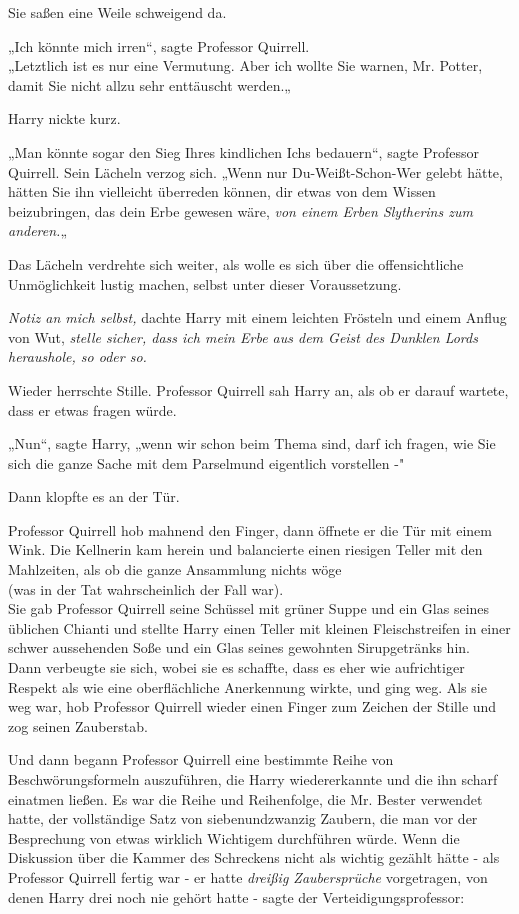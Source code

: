 {Sie saßen eine Weile schweigend da.

„Ich könnte mich irren“, sagte Professor Quirrell.\\ „Letztlich ist es nur eine Vermutung. Aber ich wollte Sie warnen, Mr. Potter, damit Sie nicht allzu sehr enttäuscht werden.„

Harry nickte kurz.

„Man könnte sogar den Sieg Ihres kindlichen Ichs bedauern“, sagte Professor Quirrell. Sein Lächeln verzog sich. „Wenn nur Du-Weißt-Schon-Wer gelebt hätte, hätten Sie ihn vielleicht überreden können, dir etwas von dem Wissen beizubringen, das dein Erbe gewesen wäre, \emph{von einem Erben Slytherins zum anderen.}„

Das Lächeln verdrehte sich weiter, als wolle es sich über die offensichtliche Unmöglichkeit lustig machen, selbst unter dieser Voraussetzung.

\emph{Notiz an mich selbst,} dachte Harry mit einem leichten Frösteln und einem Anflug von Wut, \emph{stelle sicher, dass ich mein Erbe aus dem Geist des Dunklen Lords heraushole, so oder so.}

Wieder herrschte Stille. Professor Quirrell sah Harry an, als ob er darauf wartete, dass er etwas fragen würde.

„Nun“, sagte Harry, „wenn wir schon beim Thema sind, darf ich fragen, wie Sie sich die ganze Sache mit dem Parselmund eigentlich vorstellen -"

Dann klopfte es an der Tür.

Professor Quirrell hob mahnend den Finger, dann öffnete er die Tür mit einem Wink. Die Kellnerin kam herein und balancierte einen riesigen Teller mit den Mahlzeiten, als ob die ganze Ansammlung nichts wöge\\ (was in der Tat wahrscheinlich der Fall war).\\ Sie gab Professor Quirrell seine Schüssel mit grüner Suppe und ein Glas seines üblichen Chianti und stellte Harry einen Teller mit kleinen Fleischstreifen in einer schwer aussehenden Soße und ein Glas seines gewohnten Sirupgetränks hin.\\ Dann verbeugte sie sich, wobei sie es schaffte, dass es eher wie aufrichtiger Respekt als wie eine oberflächliche Anerkennung wirkte, und ging weg. Als sie weg war, hob Professor Quirrell wieder einen Finger zum Zeichen der Stille und zog seinen Zauberstab.

Und dann begann Professor Quirrell eine bestimmte Reihe von Beschwörungsformeln auszuführen, die Harry wiedererkannte und die ihn scharf einatmen ließen. Es war die Reihe und Reihenfolge, die Mr. Bester verwendet hatte, der vollständige Satz von siebenundzwanzig Zaubern, die man vor der Besprechung von etwas wirklich Wichtigem durchführen würde. Wenn die Diskussion über die Kammer des Schreckens nicht als wichtig gezählt hätte - als Professor Quirrell fertig war - er hatte \emph{dreißig Zaubersprüche} vorgetragen, von denen Harry drei noch nie gehört hatte - sagte der Verteidigungsprofessor:

}
